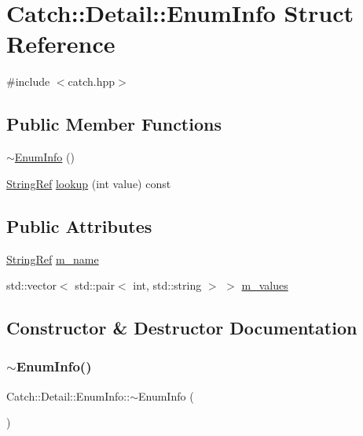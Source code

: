 \hypertarget{struct_catch_1_1_detail_1_1_enum_info}{}\section{Catch\+::Detail\+::Enum\+Info Struct Reference}
\label{struct_catch_1_1_detail_1_1_enum_info}


{\ttfamily \#include $<$catch.\+hpp$>$}

\subsection*{Public Member Functions}
\begin{DoxyCompactItemize}
\item 
\mbox{\hyperlink{struct_catch_1_1_detail_1_1_enum_info_ab6608593c00614a688045fe8d911258d}{$\sim$\+Enum\+Info}} ()
\item 
\mbox{\hyperlink{class_catch_1_1_string_ref}{String\+Ref}} \mbox{\hyperlink{struct_catch_1_1_detail_1_1_enum_info_a2fdfacc411d7afb1cb690366e5e49cb3}{lookup}} (int value) const
\end{DoxyCompactItemize}
\subsection*{Public Attributes}
\begin{DoxyCompactItemize}
\item 
\mbox{\hyperlink{class_catch_1_1_string_ref}{String\+Ref}} \mbox{\hyperlink{struct_catch_1_1_detail_1_1_enum_info_a16ecfd3a7e11439433aabbdf6ecb676c}{m\+\_\+name}}
\item 
std\+::vector$<$ std\+::pair$<$ int, std\+::string $>$ $>$ \mbox{\hyperlink{struct_catch_1_1_detail_1_1_enum_info_a1093082858366071bae0eba1fb3c3388}{m\+\_\+values}}
\end{DoxyCompactItemize}


\subsection{Constructor \& Destructor Documentation}
\mbox{\label{struct_catch_1_1_detail_1_1_enum_info_ab6608593c00614a688045fe8d911258d}} 
\subsubsection{\texorpdfstring{$\sim$EnumInfo()}{~EnumInfo()}}
{\footnotesize\ttfamily Catch\+::\+Detail\+::\+Enum\+Info\+::$\sim$\+Enum\+Info (\begin{DoxyParamCaption}{ }\end{DoxyParamCaption})}



